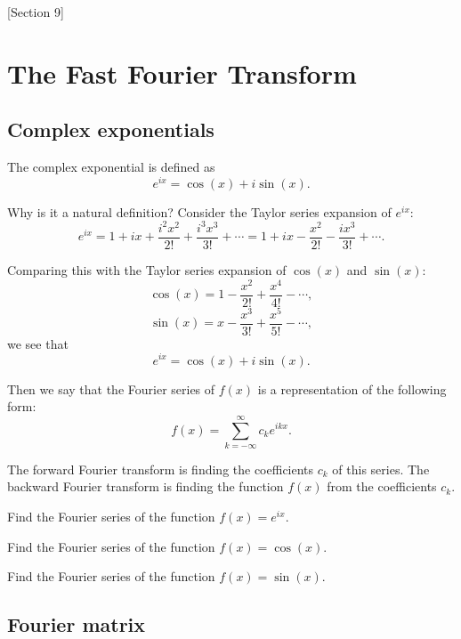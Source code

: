 [Section 9]

\newpage

\section{The Fast Fourier Transform}

\subsection{Complex exponentials}

\begin{definition}
The complex exponential is defined as
$$
e^{ix} = \cos(x) + i\sin(x).
$$
\end{definition}

Why is it a natural definition? Consider the Taylor series expansion of $e^{ix}$:
$$
e^{ix} = 1 + ix + \frac{i^2x^2}{2!} + \frac{i^3x^3}{3!} + \cdots = 1 + ix - \frac{x^2}{2!} - \frac{ix^3}{3!} + \cdots.
$$

Comparing this with the Taylor series expansion of $\cos(x)$ and $\sin(x)$:
$$
\cos(x) = 1 - \frac{x^2}{2!} + \frac{x^4}{4!} - \cdots,
$$
$$
\sin(x) = x - \frac{x^3}{3!} + \frac{x^5}{5!} - \cdots,
$$
we see that
$$
e^{ix} = \cos(x) + i\sin(x).
$$

Then we say that the Fourier series of $f(x)$ is a representation of the following form:
$$
f(x) = \sum_{k = -\infty}^{\infty} c_k e^{ikx}.
$$

The forward Fourier transform is finding the coefficients $c_k$ of this series. The backward
Fourier transform is finding the function $f(x)$ from the coefficients $c_k$.

\begin{exercise}
Find the Fourier series of the function $f(x) = e^{ix}$.
\end{exercise}

\begin{exercise}
Find the Fourier series of the function $f(x) = \cos(x)$.
\end{exercise}

\begin{exercise}
Find the Fourier series of the function $f(x) = \sin(x)$.
\end{exercise}

\subsection{Fourier matrix}

